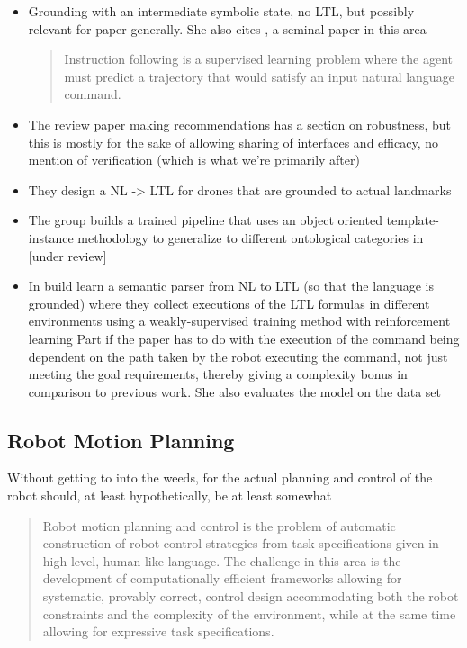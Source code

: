 \documentclass[a4paper, 11pt]{article}
\begin{document}
\begin{itemize}

\item Grounding with an intermediate symbolic state, no LTL, but possibly
  relevant for paper generally. She also cites \cite{walkTalk}, a seminal paper in this area
\begin{quote}
Instruction following is a supervised learning problem
where the agent must predict a trajectory that would satisfy an
input natural language command. \cite{tellexInstr}
\end{quote}
\item The review paper \cite{MARGE2022101255} making recommendations has a
  section on robustness, but this is mostly for the sake of allowing sharing of
  interfaces and efficacy, no mention of verification (which is what we're
  primarily after)
\item They design a NL -> LTL for drones that are grounded to actual landmarks \cite{9197068}
\item The group builds a trained pipeline that uses an object oriented
  template-instance methodology to generalize to different ontological
  categories in  \cite{hsiung2021generalizing} [under review]

\item In \cite{patellearning} build learn a semantic parser from NL to LTL (so
that the language is grounded) where they collect executions of the LTL formulas
in different environments using a weakly-supervised training method with
reinforcement learning Part if the paper has to do with the execution of the
command being dependent on the path taken by the robot executing the command,
not just meeting the goal requirements, thereby giving a complexity bonus in
comparison to previous work. She also evaluates the model on the \cite{walkTalk}
data set
\end{itemize}

\subsection{Robot Motion Planning}

Without getting to into the weeds, for the actual planning and control of the
robot should, at least hypothetically, be at least somewhat 

\begin{quote}
  Robot motion planning and control is the problem of automatic construction of
robot control strategies from task specifications given in high-level, human-like language. The challenge
in this area is the development of computationally efficient frameworks allowing for systematic, provably
correct, control design accommodating both the robot constraints and the complexity of the environment,
while at the same time allowing for expressive task specifications.
\cite{4141034}
\end{quote}
\end{document}
